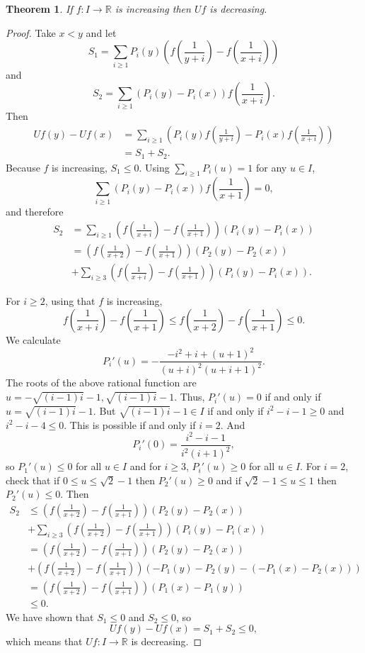 \documentclass{article}
\newtheorem{theorem}{Theorem}
\theoremstyle{definition}
\begin{document}
\begin{theorem}
If $f:I \to \mathbb{R}$ is increasing then $Uf$ is decreasing.
\end{theorem}
\begin{proof}
Take $x<y$ and let
\[
S_1 = \sum_{i \geq 1} P_i(y) \left( f\left( \frac{1}{y+i}\right)-f\left(\frac{1}{x+i}\right)\right)
\]
and 
\[
S_2 = \sum_{i \geq 1} (P_i(y)-P_i(x)) f\left(\frac{1}{x+i}\right).
\]
Then
\begin{align*}
Uf(y)-Uf(x) &= \sum_{i \geq 1} \left( P_i(y) f \left(\frac{1}{y+i}\right) - P_i(x) f\left(\frac{1}{x+i}\right)\right)\\
&=S_1+S_2.
\end{align*}
Because $f$ is increasing, $S_1 \leq 0$. 
Using $\sum_{i \geq 1} P_i(u) = 1$ for any $u \in I$, 
\[
\sum_{i \geq 1}(P_i(y)-P_i(x)) f \left(\frac{1}{x+1}\right)  
=0,
\]
and therefore
\begin{align*}
S_2 &= \sum_{i \geq 1} \left(f \left(\frac{1}{x+i} \right) - f \left(\frac{1}{x+1}\right)  \right)(P_i(y)-P_i(x))\\
&=  \left(f \left(\frac{1}{x+2} \right) - f \left(\frac{1}{x+1}\right)  \right)(P_2(y)-P_2(x))\\
&+\sum_{i \geq 3} \left(f \left(\frac{1}{x+i} \right) - f \left(\frac{1}{x+1}\right)  \right)(P_i(y)-P_i(x)).
\end{align*}


For $i \geq 2$, using that $f$ is increasing,
\[
f \left(\frac{1}{x+i} \right) - f \left(\frac{1}{x+1}\right)  \leq  f \left(\frac{1}{x+2} \right) -  f \left(\frac{1}{x+1}\right) \leq 0.
\]
We calculate
\[
P_i'(u) = - \frac{-i^2+i+(u+1)^2}{(u+i)^2(u+i+1)^2}.
\]
The roots of the above rational function are $u=-\sqrt{(i-1)i}-1,\sqrt{(i-1)i}-1$. Thus, $P_i'(u)=0$ if and only if
$u=\sqrt{(i-1)i}-1$. But $\sqrt{(i-1)i}-1 \in I$ if and only if  $i^2-i-1 \geq 0$ and $i^2-i-4 \leq 0$. This is possible if and only
if $i=2$. And
\[
P_i'(0) = \frac{i^2-i-1}{i^2(i+1)^2},
\]
so $P_1'(u) \leq 0$ for all $u \in I$ and for $i \geq 3$, $P_i'(u) \geq 0$ for all $u \in I$. 
For $i=2$, check that if $0 \leq u \leq \sqrt{2}-1$ then
$P_2'(u) \geq 0$ and if $\sqrt{2}-1 \leq u \leq 1$ then $P_2'(u) \leq 0$. 
Then
\begin{align*}
S_2&\leq  \left(f \left(\frac{1}{x+2} \right) - f \left(\frac{1}{x+1}\right)  \right)(P_2(y)-P_2(x))\\
&+\sum_{i \geq 3} \left(f \left(\frac{1}{x+2} \right) - f \left(\frac{1}{x+1}\right)  \right)(P_i(y)-P_i(x))\\
&= \left(f \left(\frac{1}{x+2} \right) - f \left(\frac{1}{x+1}\right)  \right)(P_2(y)-P_2(x))\\
&+\left(f \left(\frac{1}{x+2} \right) - f \left(\frac{1}{x+1}\right)  \right)(-P_1(y)-P_2(y) - (-P_1(x)-P_2(x)))\\
&= \left(f \left(\frac{1}{x+2} \right) - f \left(\frac{1}{x+1}\right)\right)(P_1(x)-P_1(y))\\
&\leq 0.
\end{align*}
We have shown that $S_1 \leq 0$ and $S_2 \leq 0$, so
\[
Uf(y)-Uf(x) = S_1+S_2 \leq 0,
\]
which means that $Uf:I \to \mathbb{R}$ is decreasing.
\end{proof}
\end{document}
